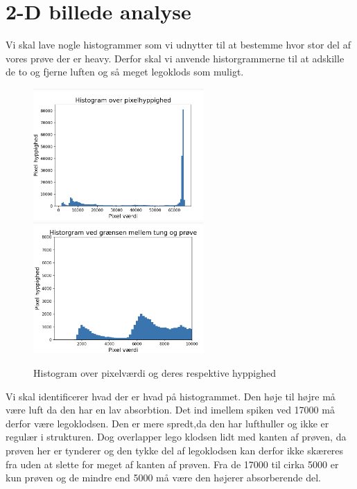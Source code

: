 \documentclass[a4paper,twoside]{article}
\begin{document}
\section{2-D billede analyse}
Vi skal lave nogle histogrammer som vi udnytter til at bestemme hvor stor del af vores prøve der er heavy. Derfor skal vi anvende historgrammerne til at adskille de to og fjerne luften og så meget legoklods som muligt. 
\begin{figure}[H]
\begin{centering}
\includegraphics[height=5cm]{Histogram2d.PNG}
\includegraphics[height=5cm]{2dhistogram0til10000.png}
\hspace{1cm}
\par\end{centering}
\caption{\label{cap:2ien} Histogram over pixelværdi og deres respektive hyppighed}
\end{figure}
Vi skal identificerer hvad der er hvad på histogrammet. Den høje til højre må være luft da den har en lav absorbtion. Det ind imellem spiken ved 17000 må derfor være legoklodsen. Den er mere spredt,da den har lufthuller og ikke er regulær i strukturen. Dog overlapper lego klodsen lidt med kanten af prøven, da prøven her er tynderer og den tykke del af legoklodsen kan derfor ikke skæreres fra uden at slette for meget af kanten af prøven. Fra de 17000 til cirka 5000 er kun prøven og de mindre end 5000 må være den højerer absorberende del.  
\end{document}
